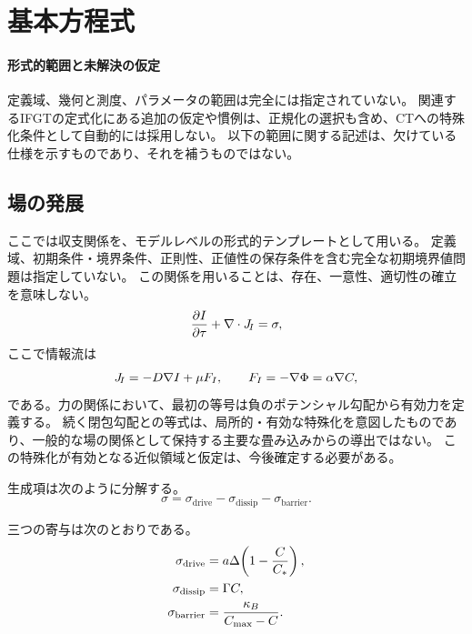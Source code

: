 \section{基本方程式}
\label{sec:core}

\paragraph{形式的範囲と未解決の仮定}
定義域、幾何と測度、パラメータの範囲は完全には指定されていない。
関連するIFGTの定式化にある追加の仮定や慣例は、正規化の選択も含め、CTへの特殊化条件として自動的には採用しない。
以下の範囲に関する記述は、欠けている仕様を示すものであり、それを補うものではない。

\subsection{場の発展}
ここでは収支関係を、モデルレベルの形式的テンプレートとして用いる。
定義域、初期条件・境界条件、正則性、正値性の保存条件を含む完全な初期境界値問題は指定していない。
この関係を用いることは、存在、一意性、適切性の確立を意味しない。
\begin{equation}
  \frac{\partial I}{\partial\tau} + \nabla\cdot J_{\!I} = \sigma,
  \label{eq:I_evolution}
\end{equation}
ここで情報流は
\begin{equation}
  J_{\!I} = -D\nabla I + \mu F_I, \qquad F_I = -\nabla\Phi = \alpha\nabla C,
  \label{eq:JI}
\end{equation}
である。力の関係において、最初の等号は負のポテンシャル勾配から有効力を定義する。
続く閉包勾配との等式は、局所的・有効な特殊化を意図したものであり、一般的な場の関係として保持する主要な畳み込みからの導出ではない。
この特殊化が有効となる近似領域と仮定は、今後確定する必要がある。

生成項は次のように分解する。
\begin{equation}
  \sigma = \sigma_{\mathrm{drive}} - \sigma_{\mathrm{dissip}} - \sigma_{\mathrm{barrier}}.
  \label{eq:sigma}
\end{equation}

三つの寄与は次のとおりである。
\begin{align}
  \sigma_{\mathrm{drive}}  &= a\Delta\!\left(1 - \frac{C}{C_*}\right),
  \label{eq:sigma_drive}\\
  \sigma_{\mathrm{dissip}} &= \Gamma C,
  \label{eq:sigma_dissip}\\
  \sigma_{\mathrm{barrier}}&= \frac{\kappa_B}{C_{\max} - C}.
  \label{eq:sigma_barrier}
\end{align}

